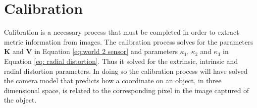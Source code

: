 \documentclass[12pt,oneside,openany,a4paper, %
english, %
masters-t, goldenblock]{usthesis}
\newcommand*\mean[1]{\bar{#1}} %
\begin{document}











\section{Calibration}
Calibration is a necessary process that must be completed in order to extract metric information from images. The calibration process solves for the parameters $\bm{K}$ and $\bm{V}$ in Equation \ref{eq:world 2 sensor} and parameters $\kappa_1$, $\kappa_2$ and $\kappa_3$ in Equation \ref{eq: radial distortion}. Thus it solved for the extrinsic, intrinsic and radial distortion parameters. In doing so the calibration process will have solved the camera model that predicts how a coordinate on an object, in three dimensional space, is related to the corresponding pixel in the image captured of the object.

\end{document}
